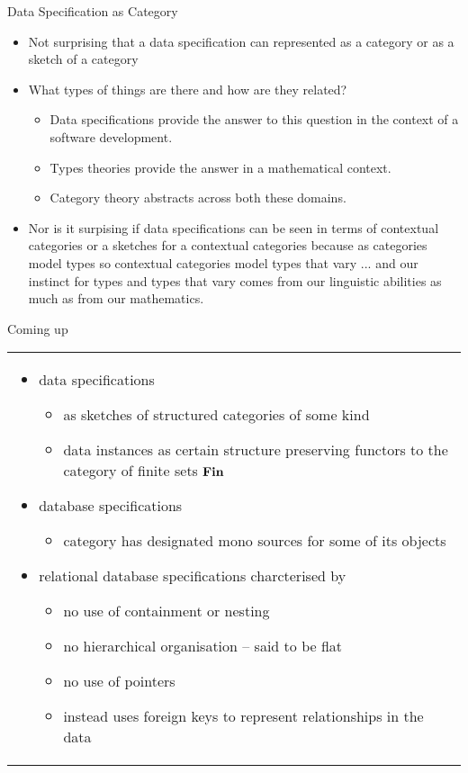 \begin{frame}{Data Specification as Category}
\begin{itemize}
 \item Not surprising that a data specification can represented as a category or as a sketch of a category
\pause \item
What types of things are there and how are they related? 
\begin{itemize}
\item Data specifications provide the answer to this question in the context of a software development. 
\item Types theories provide the answer in a mathematical context. 
\item Category theory abstracts across both these domains.
\end{itemize}
\pause \item Nor is it surpising if data specifications can be seen in terms
of contextual categories or a sketches for a contextual categories
because as categories model types so contextual categories model types that vary
\pause ... and  our instinct for types and types that vary comes from our linguistic abilities as much as from our mathematics.
\end{itemize}
\end{frame}

\begin{frame}{Coming up}
\begin{center}
\begin{tabular}{p{12cm}}
\begin{itemize}
    \item data specifications 
    \begin{itemize}
        \item as sketches of structured categories of some kind
        \item data instances as certain structure preserving functors to the category of finite sets $\textbf{Fin}$
    \end{itemize}
    \item database specifications
    \begin{itemize}
         \item category has designated mono sources for some of its objects 
    \end{itemize}
    \item relational database specifications charcterised by
    \begin{itemize}
         \item no use of containment or nesting
         \item no  hierarchical organisation -- said to be flat
         \item no use of pointers 
         \item instead uses foreign keys to represent relationships in the data
    \end{itemize}
\end{itemize} 
\end{tabular}
\end{center}
\end{frame}

